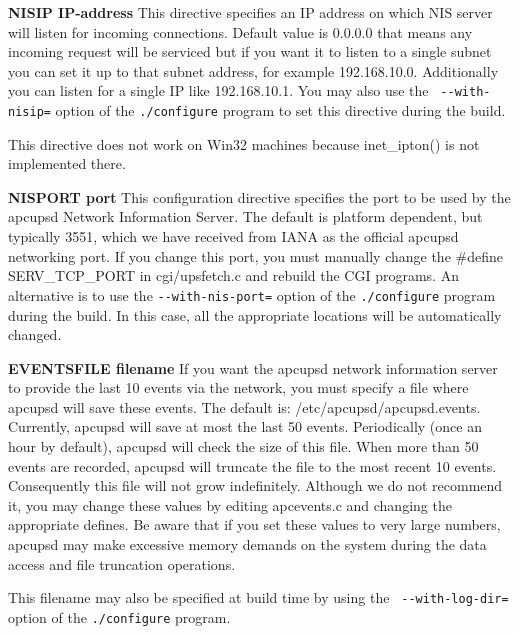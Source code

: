 {{{{{{{{{{{\begin{description}
\item {\bf NISIP \lt{}IP-address\gt{}}
This directive specifies an IP address on which NIS server will listen for
incoming connections. Default value is 0.0.0.0 that means any incoming request
will be serviced but if you want it to listen to a single subnet you can set
it up to that subnet address, for example 192.168.10.0. Additionally you can
listen for a single IP like 192.168.10.1. You may also use the {\tt
\verb{--{with-nisip=} option of the {\tt ./configure} program to set this directive
during the build.  

This directive does not work on Win32 machines because inet\_ipton() is not
implemented there.  

\item {\bf NISPORT \lt{}port\gt{}}
This configuration directive specifies the port to be used by the apcupsd
Network Information Server. The default is platform dependent, but typically
3551, which we have received from IANA as the official apcupsd networking
port. If you change this port, you must manually change the \#define
SERV\_TCP\_PORT in cgi/upsfetch.c and rebuild the CGI programs. An alternative
is to use the {\tt \verb{--{with-nis-port=} option of the {\tt ./configure} program
during the build. In this case, all the appropriate locations will be
automatically changed.  

\item {\bf EVENTSFILE \lt{}filename\gt{}}
If you want the apcupsd network information server to provide the last 10
events via the network, you must specify a file where apcupsd will save these
events. The default is: /etc/apcupsd/apcupsd.events. Currently, apcupsd will
save at most the last 50 events. Periodically (once an hour by default),
apcupsd will check the size of this file. When more than 50 events are
recorded, apcupsd will truncate the file to the most recent 10 events.
Consequently this file will not grow indefinitely. Although we do not
recommend it, you may change these values by editing apcevents.c and changing
the appropriate defines. Be aware that if you set these values to very large
numbers, apcupsd may make excessive memory demands on the system during the
data access and file truncation operations.  

This filename may also be specified at build time by using the {\tt
\verb{--{with-log-dir=} option of the {\tt ./configure} program. 
\end{description}

}}}}}}}}}}}
